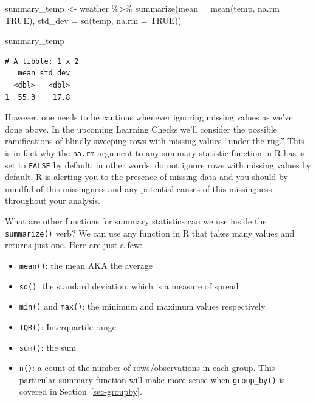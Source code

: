 \documentclass[
  letterpaper,
  DIV=11,
  numbers=noendperiod]{scrreprt}
\newenvironment{Shaded}{\begin{snugshade}}{\end{snugshade}}
\newcommand{\AttributeTok}[1]{\textcolor[rgb]{0.40,0.45,0.13}{#1}}
\newcommand{\ConstantTok}[1]{\textcolor[rgb]{0.56,0.35,0.01}{#1}}
\newcommand{\FunctionTok}[1]{\textcolor[rgb]{0.28,0.35,0.67}{#1}}
\newcommand{\NormalTok}[1]{\textcolor[rgb]{0.00,0.23,0.31}{#1}}
\newcommand{\OtherTok}[1]{\textcolor[rgb]{0.00,0.23,0.31}{#1}}
\newcommand{\SpecialCharTok}[1]{\textcolor[rgb]{0.37,0.37,0.37}{#1}}
\theoremstyle{definition}
\theoremstyle{remark}
\begin{document}
\begin{Shaded}
\begin{Highlighting}[]
\NormalTok{summary\_temp }\OtherTok{\textless{}{-}}\NormalTok{ weather }\SpecialCharTok{\%\textgreater{}\%} 
  \FunctionTok{summarize}\NormalTok{(}\AttributeTok{mean =} \FunctionTok{mean}\NormalTok{(temp, }\AttributeTok{na.rm =} \ConstantTok{TRUE}\NormalTok{), }
            \AttributeTok{std\_dev =} \FunctionTok{sd}\NormalTok{(temp, }\AttributeTok{na.rm =} \ConstantTok{TRUE}\NormalTok{))}

\NormalTok{summary\_temp}
\end{Highlighting}
\end{Shaded}

\begin{verbatim}
# A tibble: 1 x 2
   mean std_dev
  <dbl>   <dbl>
1  55.3    17.8
\end{verbatim}

However, one needs to be cautious whenever ignoring missing values as
we've done above. In the upcoming Learning Checks we'll consider the
possible ramifications of blindly sweeping rows with missing values
``under the rug.'' This is in fact why the \texttt{na.rm} argument to
any summary statistic function in R has is set to \texttt{FALSE} by
default; in other words, do not ignore rows with missing values by
default. R is alerting you to the presence of missing data and you
should by mindful of this missingness and any potential causes of this
missingness throughout your analysis.

What are other functions for summary statistics can we use inside the
\texttt{summarize()} verb? We can use any function in R that takes many
values and returns just one. Here are just a few:

\begin{itemize}
\item
  \texttt{mean()}: the mean AKA the average
\item
  \texttt{sd()}: the standard deviation, which is a measure of spread
\item
  \texttt{min()} and \texttt{max()}: the minimum and maximum values
  respectively
\item
  \texttt{IQR()}: Interquartile range
\item
  \texttt{sum()}: the sum
\item
  \texttt{n()}: a count of the number of rows/observations in each
  group. This particular summary function will make more sense when
  \texttt{group\_by()} is covered in Section~\ref{sec-groupby}.
\end{itemize}
\end{document}
